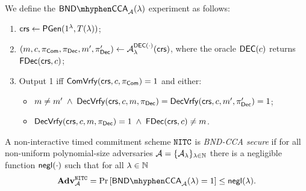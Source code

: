 
\begin{definition}
\label{def:nitc-bnd}
We define the $\mathsf{BND \mhyphen CCA}_\adv(\secpar)$ experiment as follows:
\begin{enumerate}
\item $\mathsf{crs} \leftarrow \mathsf{PGen}(1{^{\lambda}}, T(\lambda))$;
\item $(m, c, \pi_{\mathsf{Com}}, \pi_{\mathsf{Dec}}, m', \pi_{\mathsf{Dec}}') \leftarrow \mathcal{A}_{\lambda}^{\mathsf{DEC}(\cdot)}(\mathsf{crs})$, where the oracle $\mathsf{DEC}(c)$ returns $\mathsf{FDec}(\mathsf{crs}, c)$;
\item Output 1 iff $\mathsf{ComVrfy}(\mathsf{crs}, c, \pi_{\mathsf{Com}})= 1$ and either:
\begin{itemize}
\item $m \neq m' \; \land \; \mathsf{DecVrfy}(\mathsf{crs}, c, m, \pi_{\mathsf{Dec}}) = \mathsf{DecVrfy}(\mathsf{crs}, c, m', \pi_{\mathsf{Dec}}') = 1$;
\item $\mathsf{DecVrfy}(\mathsf{crs}, c, m, \pi_{\mathsf{Dec}}) = 1 \; \land \; \mathsf{FDec}(\mathsf{crs}, c) \neq m$.
\end{itemize}
\end{enumerate}
A non-interactive timed commitment scheme $\mathtt{NITC}$ is \emph{BND-CCA secure} if for all non-uniform polynomial-size adversaries $\mathcal{A} = \{\mathcal{A}_{\lambda}\}_{\lambda \in \mathbb{N}}$ there is a negligible function $\mathsf{negl}(\cdot)$ such that for all $\lambda \in \mathbb{N}$ 
\[ \advtg^{\nitc}_{\adv} = 
\Pr\left[ \mathsf{BND \mhyphen CCA}_\adv(\secpar) = 1 \right] \leq \negl(\secpar). 
\]
\end{definition}

%

